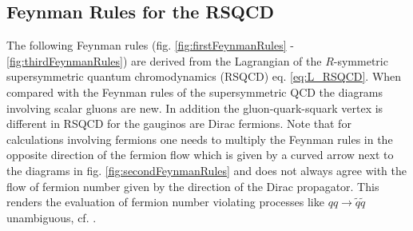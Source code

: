 \subsection{Feynman Rules for the RSQCD}\label{sec:FeynmanRules}
The following Feynman rules (fig. \ref{fig:firstFeynmanRules} - \ref{fig:thirdFeynmanRules}) are derived from the Lagrangian of the $R$-symmetric supersymmetric quantum chromodynamics (RSQCD) eq. \eqref{eq:L_RSQCD}. When compared with the Feynman rules of the supersymmetric QCD the diagrams involving scalar gluons are new. In addition the gluon-quark-squark vertex is different in RSQCD for the gauginos are Dirac fermions. Note that for calculations involving fermions one needs to multiply the Feynman rules in the opposite direction of the fermion flow which is given by a curved arrow next to the diagrams in fig. \ref{fig:secondFeynmanRules} and does not always agree with the flow of fermion number given by the direction of the Dirac propagator. This renders the evaluation of fermion number violating processes like $qq \to \tilde{q}\tilde{q}$ unambiguous, cf. \cite{Beenakker:1996ch}.
